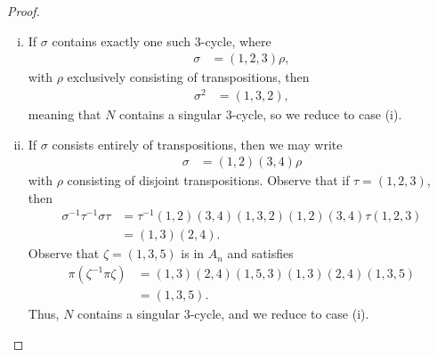 \documentclass[10pt]{mypackage}
\begin{document}
\begin{proof}
\begin{enumerate}[(i)]
\begin{align*}
                                       &= \left( 1,4,2,6,3 \right).
      \end{align*}
      Thus, $\pi\in G_5\cap N$.
    \item If $\sigma$ contains exactly one such $3$-cycle, where
      \begin{align*}
        \sigma &= \left( 1,2,3 \right)\rho,
      \end{align*}
      with $\rho$ exclusively consisting of transpositions, then
      \begin{align*}
        \sigma^2 &= \left( 1,3,2 \right),
      \end{align*}
      meaning that $N$ contains a singular $3$-cycle, so we reduce to case (i).
    \item If $\sigma$ consists entirely of transpositions, then we may write
      \begin{align*}
        \sigma &= \left( 1,2 \right)\left( 3,4 \right)\rho
      \end{align*}
      with $\rho$ consisting of disjoint transpositions. Observe that if $\tau = \left( 1,2,3 \right)$, then 
      \begin{align*}
        \sigma^{-1}\tau^{-1}\sigma\tau &= \tau^{-1}\left( 1,2 \right)\left( 3,4 \right)\left( 1,3,2 \right)\left( 1,2 \right)\left( 3,4 \right)\tau \left( 1,2,3 \right)\\
                                       &= \left( 1,3 \right)\left( 2,4 \right).
      \end{align*}
      Observe that $\zeta = \left( 1,3,5 \right)$ is in $A_n$ and satisfies
      \begin{align*}
        \pi\left( \zeta^{-1}\pi\zeta \right) &= \left( 1,3 \right)\left( 2,4 \right)\left( 1,5,3 \right)\left( 1,3 \right)\left( 2,4 \right)\left( 1,3,5 \right)\\
                                             &= \left( 1,3,5 \right).
      \end{align*}
      Thus, $N$ contains a singular $3$-cycle, and we reduce to case (i).
  \end{enumerate}
\end{proof}
\end{document}
